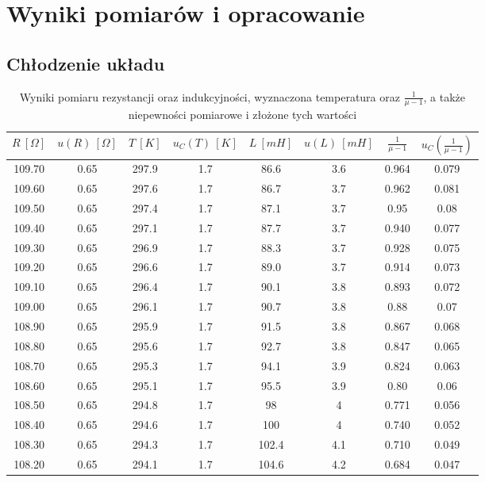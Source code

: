 \documentclass[12pt, a4paper, oneside]{article}
\begin{document}
\section{Wyniki pomiarów i opracowanie}
\subsection{Chłodzenie układu}
\begin{longtable}{|c|c|c|c|c|c|c|c|}
\caption{Wyniki pomiaru rezystancji oraz indukcyjności, wyznaczona temperatura oraz $\frac{1}{\mu-1}$, a także niepewności pomiarowe i złożone tych wartości}
\label{variability_impl_mech}
\endfirsthead
\endhead
\hline
    $R~[\Omega]$ & $u(R)~[\Omega]$ & $T~[K]$ & $u_C(T)~[K]$ & $L~[mH]$ & 
    $u(L)~[mH]$ & $\frac{1}{\mu-1}$ & $u_C(\frac{1}{\mu-1})$ \\\hline
    109.70 & 0.65 & 297.9 & 1.7 & 86.6 & 3.6 & 0.964 & 0.079 \\\hline
    109.60 & 0.65 & 297.6 & 1.7 & 86.7 & 3.7 & 0.962 & 0.081 \\\hline
    109.50 & 0.65 & 297.4 & 1.7 & 87.1 & 3.7 & 0.95 & 0.08 \\\hline
    109.40 & 0.65 & 297.1 & 1.7 & 87.7 & 3.7 & 0.940 & 0.077 \\\hline
    109.30 & 0.65 & 296.9 & 1.7 & 88.3 & 3.7 & 0.928 & 0.075 \\\hline
    109.20 & 0.65 & 296.6 & 1.7 & 89.0 & 3.7 & 0.914 & 0.073 \\\hline
    109.10 & 0.65 & 296.4 & 1.7 & 90.1 & 3.8 & 0.893 & 0.072 \\\hline
    109.00 & 0.65 & 296.1 & 1.7 & 90.7 & 3.8 & 0.88 & 0.07 \\\hline
    108.90 & 0.65 & 295.9 & 1.7 & 91.5 & 3.8 & 0.867 & 0.068 \\\hline
    108.80 & 0.65 & 295.6 & 1.7 & 92.7 & 3.8 & 0.847 & 0.065 \\\hline
    108.70 & 0.65 & 295.3 & 1.7 & 94.1 & 3.9 & 0.824 & 0.063 \\\hline
    108.60 & 0.65 & 295.1 & 1.7 & 95.5 & 3.9 & 0.80 & 0.06 \\\hline
    108.50 & 0.65 & 294.8 & 1.7 & 98 & 4 & 0.771 & 0.056 \\\hline
    108.40 & 0.65 & 294.6 & 1.7 & 100 & 4 & 0.740 & 0.052 \\\hline
    108.30 & 0.65 & 294.3 & 1.7 & 102.4 & 4.1 & 0.710 & 0.049 \\\hline
    108.20 & 0.65 & 294.1 & 1.7 & 104.6 & 4.2 & 0.684 & 0.047 \\\hline

\end{longtable}
\end{document}
